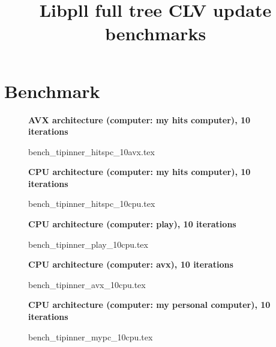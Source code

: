 \documentclass[a4paper]{article}
\begin{document}
\newcommand*{\figuretitle}[1]{%
    {\centering%
    \textbf{#1}%
    \par\medskip}%
}


\title{Libpll full tree CLV update benchmarks}
\maketitle



\section{Benchmark}


\begin{figure}[!htb]
\figuretitle{AVX architecture (computer: my hits computer), 10 iterations}
{bench_tipinner_hitspc_10avx.tex}
\end{figure}

\begin{figure}[!htb]
\figuretitle{CPU architecture (computer: my hits computer), 10 iterations}
{bench_tipinner_hitspc_10cpu.tex}
\end{figure}

\begin{figure}[!htb]
\figuretitle{CPU architecture (computer: play), 10 iterations}
{bench_tipinner_play_10cpu.tex}
\end{figure}

\begin{figure}[!htb]
\figuretitle{CPU architecture (computer: avx), 10 iterations}
{bench_tipinner_avx_10cpu.tex}
\end{figure}


\begin{figure}[!htb]
\figuretitle{CPU architecture (computer: my personal computer), 10 iterations}
{bench_tipinner_mypc_10cpu.tex}
\end{figure}
\end{document}
